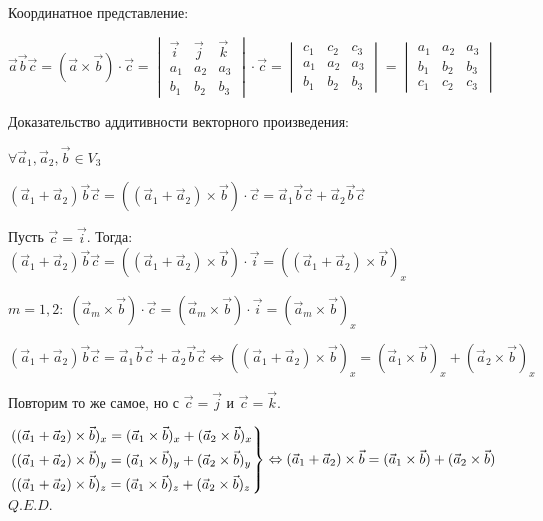 \documentclass[twoside]{book}
\begin{document}
Координатное представление:

\(\vec a \vec b \vec c = (\vec a \times \vec b) \cdot \vec c =
\begin{vmatrix}
    \vec i & \vec j & \vec k \\
    a_1    & a_2    & a_3    \\
    b_1    & b_2    & b_3
\end{vmatrix} \cdot \vec c =
\begin{vmatrix}
    c_1 & c_2 & c_3 \\
    a_1 & a_2 & a_3 \\
    b_1 & b_2 & b_3
\end{vmatrix} =
\begin{vmatrix}
    a_1 & a_2 & a_3 \\
    b_1 & b_2 & b_3 \\
    c_1 & c_2 & c_3
\end{vmatrix}\)

Доказательство аддитивности векторного произведения:

\(\forall \vec a_1, \vec a_2, \vec b \in V_3\)

\((\vec a_1 + \vec a_2)\vec b \vec c = ((\vec a_1 + \vec a_2) \times \vec b) \cdot \vec c = \vec a_1 \vec b \vec c + \vec a_2 \vec b \vec c\)

Пусть \(\vec c = \vec i\). Тогда: \((\vec a_1 + \vec a_2)\vec b \vec c = ((\vec a_1 + \vec a_2) \times \vec b) \cdot \vec i = ((\vec a_1 + \vec a_2) \times \vec b)_x\)

\(m = 1, 2:\; (\vec a_m \times \vec b) \cdot \vec c = (\vec a_m \times \vec b) \cdot \vec i = (\vec a_m \times \vec b)_x\)

\((\vec a_1 + \vec a_2)\vec b \vec c = \vec a_1 \vec b \vec c + \vec a_2 \vec b \vec c \Leftrightarrow ((\vec a_1 + \vec a_2) \times \vec b)_x = (\vec a_1 \times \vec b)_x + (\vec a_2 \times \vec b)_x\)

Повторим то же самое, но с \(\vec c = \vec j\) и \(\vec c = \vec k\).

\(\begin{rcases}
    ((\vec a_1 + \vec a_2) \times \vec b)_x = (\vec a_1 \times \vec b)_x + (\vec a_2 \times \vec b)_x \\
    ((\vec a_1 + \vec a_2) \times \vec b)_y = (\vec a_1 \times \vec b)_y + (\vec a_2 \times \vec b)_y \\
    ((\vec a_1 + \vec a_2) \times \vec b)_z = (\vec a_1 \times \vec b)_z + (\vec a_2 \times \vec b)_z
\end{rcases} \Leftrightarrow (\vec a_1 + \vec a_2) \times \vec b = (\vec a_1 \times \vec b) + (\vec a_2 \times \vec b)\) \(Q.E.D.\)
\end{document}
